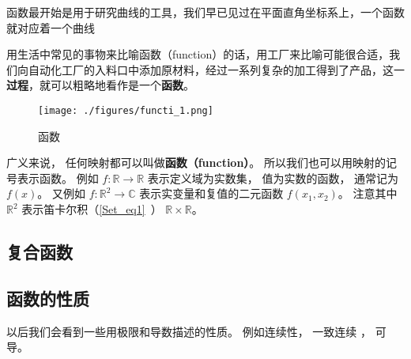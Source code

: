 

\begin{issues}
\issueDraft
\issueTODO
\end{issues}

函数最开始是用于研究曲线的工具，我们早已见过在平面直角坐标系上，一个函数就对应着一个曲线

用生活中常见的事物来比喻函数（function）的话，用工厂来比喻可能很合适，我们向自动化工厂的入料口中添加原材料，经过一系列复杂的加工得到了产品，这一\textbf{过程}，就可以粗略地看作是一个\textbf{函数}。

\begin{figure}[ht]
\centering
\texttt{[image: ./figures/functi\_1.png]}
\caption{函数} \label{functi_fig1}
\end{figure}


广义来说， 任何映射都可以叫做\textbf{函数（function）}。 所以我们也可以用映射的记号表示函数。 例如 $f: \mathbb R \to \mathbb R$ 表示定义域为实数集， 值为实数的函数， 通常记为 $f(x)$。 又例如 $f: \mathbb R^2 \to \mathbb C$ 表示实变量和复值的二元函数 $f(x_1, x_2)$。 注意其中 $\mathbb R^2$ 表示笛卡尔积（\autoref{Set_eq1}~） $\mathbb R \times \mathbb R$。

\subsection{复合函数}

\subsection{函数的性质}
以后我们会看到一些用极限和导数描述的性质。 例如连续性， 一致连续 %
， 可导。
